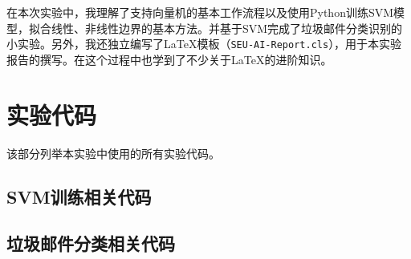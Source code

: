 \documentclass{SEU-AI-Report}
\begin{document}
在本次实验中，我理解了支持向量机的基本工作流程以及使用Python训练SVM模型，拟合线性、非线性边界的基本方法。并基于SVM完成了垃圾邮件分类识别的小实验。另外，我还独立编写了\LaTeX 模板（\texttt{SEU-AI-Report.cls}），用于本实验报告的撰写。在这个过程中也学到了不少关于\LaTeX 的进阶知识。

\nocite{qiu2020nndl}
\printbibliography

\appendix
\section{实验代码}
该部分列举本实验中使用的所有实验代码。
\subsection{SVM训练相关代码}\label{sec:SVM}
\subsection{垃圾邮件分类相关代码}\label{sec:spam}
\end{document}
